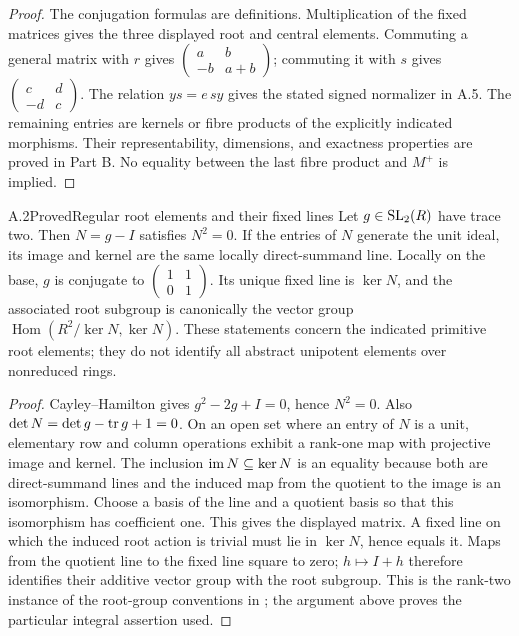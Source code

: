 \begin{proof}
The conjugation formulas are definitions. Multiplication of the
fixed matrices gives the three displayed root and central elements.
Commuting a general matrix with $r$ gives
$\left(\begin{smallmatrix}a&b\\-b&a+b\end{smallmatrix}\right)$;
commuting it with $s$ gives
$\left(\begin{smallmatrix}c&d\\-d&c\end{smallmatrix}\right)$.
The relation $ys=e\,sy$ gives the stated signed normalizer in
A.5. The remaining entries are kernels or fibre products of
the explicitly indicated morphisms. Their representability,
dimensions, and exactness properties are proved in Part B.
No equality between the last fibre product and $M^+$ is implied.
\end{proof}

\begin{statement}{A.2}{Proved}{Regular root elements and their fixed lines}
Let $g\in\operatorname{SL}_2(R)$ have trace two. Then $N=g-I$ satisfies $N^2=0$.
If the entries of $N$ generate the unit ideal, its image and kernel
are the same locally direct-summand line. Locally on the base,
$g$ is conjugate to
$\left(\begin{smallmatrix}1&1\\0&1\end{smallmatrix}\right)$.
Its unique fixed line is $\ker N$, and the associated root subgroup
is canonically the vector group
$\operatorname{Hom}(R^2/\ker N,\ker N)$.
These statements concern the indicated primitive root elements;
they do not identify all abstract unipotent elements over
nonreduced rings.
\end{statement}
\begin{proof}
Cayley--Hamilton gives $g^2-2g+I=0$, hence $N^2=0$.
Also $\det N=\det g-\operatorname{tr} g+1=0$.
On an open set where an entry of $N$ is a unit, elementary row
and column operations exhibit a rank-one map with projective
image and kernel. The inclusion $\operatorname{im} N\subseteq\ker N$ is an
equality because both are direct-summand lines and the induced
map from the quotient to the image is an isomorphism.
Choose a basis of the line and a quotient basis so that this
isomorphism has coefficient one. This gives the displayed matrix.
A fixed line on which the induced root action is trivial must
lie in $\ker N$, hence equals it. Maps from the quotient line
to the fixed line square to zero; $h\mapsto I+h$ therefore
identifies their additive vector group with the root subgroup.
This is the rank-two instance of the root-group conventions
in \citet[Expos\'e XXIII, Definitions1.1--1.2]{AB_SGA3};
the argument above proves the particular integral assertion used.
\end{proof}

